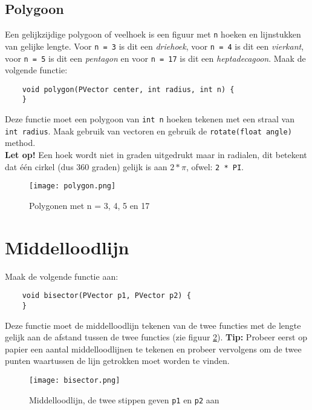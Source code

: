 \subsection{Polygoon}
Een gelijkzijdige polygoon of veelhoek is een figuur met \texttt{n} hoeken en lijnstukken van gelijke lengte. Voor \texttt{n = 3} is dit een \textit{driehoek}, voor \texttt{n = 4} is dit een \textit{vierkant}, voor \texttt{n = 5} is dit een \textit{pentagon} en voor \texttt{n = 17} is dit een \textit{heptadecagoon}. Maak de volgende functie:
\begin{lstlisting}
	void polygon(PVector center, int radius, int n) {
	}
\end{lstlisting}
Deze functie moet een polygoon van \texttt{int n} hoeken tekenen met een straal van \texttt{int radius}. Maak gebruik van vectoren en gebruik de \texttt{rotate(float angle)} method. \\
\textbf{Let op!} Een hoek wordt niet in graden uitgedrukt maar in radialen, dit betekent dat \'e\'en cirkel (dus 360 graden) gelijk is aan $2 * \pi$, ofwel: \texttt{2 * PI}.
\begin{figure}[h!]
	\centering
	\texttt{[image: polygon.png]}
	\label{fig:polygon}
	\caption{Polygonen met n = 3, 4, 5 en 17}
\end{figure}


\section{Middelloodlijn}
Maak de volgende functie aan:
\begin{lstlisting}
	void bisector(PVector p1, PVector p2) {
	}
\end{lstlisting}
Deze functie moet de middelloodlijn tekenen van de twee functies met de lengte gelijk aan de afstand tussen de twee functies (zie figuur \ref{fig:bisector}). \textbf{Tip:} Probeer eerst op papier een aantal middelloodlijnen te tekenen en probeer vervolgens om de twee punten waartussen de lijn getrokken moet worden te vinden.
\begin{figure}[h!]
	\centering
	\texttt{[image: bisector.png]}
	\label{fig:bisector}
	\caption{Middelloodlijn, de twee stippen geven \texttt{p1} en \texttt{p2} aan}
\end{figure}


